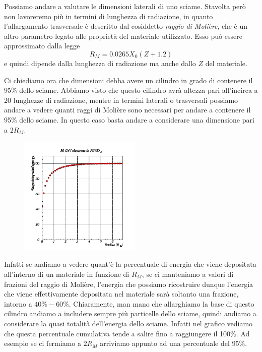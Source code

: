 Possiamo andare a valutare le dimensioni laterali di uno sciame. Stavolta però non lavoreremo più in termini di lunghezza di radiazione, in quanto l'allargamento trasversale è descritto dal cosiddetto \textit{raggio di Molière}, che è un altro parametro legato alle proprietà del materiale utilizzato. Esso può essere approssimato dalla legge
\begin{equation*}
    R_{M}=0.0265 X_0 (Z + 1.2)
\end{equation*}
e quindi dipende dalla lunghezza di radiazione ma anche dallo $Z$ del materiale.

Ci chiediamo ora che dimensioni debba avere un cilindro in grado di contenere il 95\% dello sciame. Abbiamo visto che questo cilindro avrà altezza pari all'incirca a 20 lunghezze di radiazione, mentre in termini laterali o trasversali possiamo andare a vedere quanti raggi di Molière sono necessari per andare a contenere il 95\% dello sciame. In questo caso basta andare a considerare una dimensione pari a $2R_M$.

\begin{figure}[H]
    \centering
    \includegraphics[width=0.52\textwidth]{immagini/raggio_di_Moliere_1.png}
\end{figure}

Infatti se andiamo a vedere quant'è la percentuale di energia che viene depositata all'interno di un materiale in funzione di $R_M$, se ci manteniamo a valori di frazioni del raggio di Molière, l'energia che possiamo ricostruire dunque l'energia che viene effettivamente depositata nel materiale sarà soltanto una frazione, intorno a $40\%-60\%$. Chiaramente, man mano che allarghiamo la base di questo cilindro andiamo a includere sempre più particelle dello sciame, quindi andiamo a considerare la quasi totalità dell'energia dello sciame. Infatti nel grafico vediamo che questa percentuale cumulativa tende a salire fino a raggiungere il 100\%. Ad esempio se ci fermiamo a $2R_M$ arriviamo appunto ad una percentuale del 95\%.


